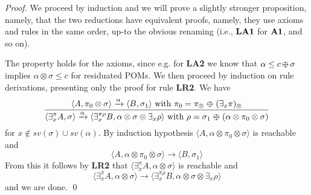 \documentclass{llncs}
\newcommand{\comment}[1]{}
\def\odiv{\, {\ominus\hspace{-7.7pt} \div} \,}
\begin{document}
\begin{proof}
We proceed by induction and we will prove a slightly stronger proposition, namely, that the two reductions
have equivalent proofs, namely, they use axioms and rules in the same order,
up-to the obvious renaming (i.e., ${\bf LA1}$ for ${\bf A1}$, and so on).

The property holds for the axioms, since e.g. for {\bf LA2} we know that
$\alpha \leq c \odiv \sigma$ implies $\alpha \otimes \sigma \leq c$ for residuated POMs.
%
We then proceed by induction on rule derivations,
presenting only the proof for rule {\bf LR2}.
%
We have 
  $$\frac {\displaystyle \langle A, \pi_0 \otimes \sigma \rangle \xrightarrow{\alpha}
  \langle B, \sigma_1 \rangle \text{ with } \pi_0 = \pi_\otimes \; {\ominus\hspace{-7.5pt} \div} \; (\exists_x \pi)_\otimes }
  {\displaystyle \langle \exists^\pi_x A, \sigma \rangle \xrightarrow{\alpha}
  \langle \exists^{\pi \rho}_x B, \alpha \otimes \sigma \otimes \exists_x \rho \rangle  \text{ with } \rho = \sigma_1 \; {\ominus\hspace{-7.5pt} \div} \; (\alpha \otimes \pi_0 \otimes \sigma)}$$
%
 for $x \not \in sv(\sigma) \cup sv(\alpha)$.
%
By induction hypothesis $\langle A, \alpha \otimes \pi_0 \otimes \sigma \rangle$ is reachable and
$$\langle A, \alpha \otimes \pi_0 \otimes \sigma \rangle \to
  \langle B, \sigma_1 \rangle$$
From this it follows by {\bf LR2} that $\langle \exists^\pi_x A, \alpha \otimes \sigma \rangle$ is reachable and
$$\langle \exists^\pi_x A, \alpha \otimes \sigma \rangle \to
  \langle \exists^{\pi \rho}_x B, \alpha \otimes \sigma \otimes \exists_x \rho \rangle$$
 and we are done.
 \qed
\comment{Reachability is implied by $\langle A, \pi_\otimes \otimes \widehat{\sigma_0} \rangle$ being reachable,
 with $\widehat{\sigma_0} = (\alpha \otimes \sigma) \odiv (\exists_x \pi)_\otimes$.
%
Now we have that 
$$\pi_\otimes \otimes \widehat{\sigma_0} = \pi_\otimes \otimes ((\alpha \otimes \sigma) \odiv (\exists_x \pi)_\otimes)$$ 
$$=^1 \pi_\otimes \otimes ((\alpha \otimes (\sigma \odiv (\exists_x \pi)_\otimes) \otimes (\exists_x \pi )_\otimes) \odiv (\exists_x \pi)_\otimes)$$
$$=^2  (\pi_\otimes \odiv (\exists_x \pi)_\otimes) \otimes (\exists_x \pi)_\otimes \otimes 
((\alpha \otimes (\sigma \odiv (\exists_x \pi)_\otimes) \otimes  (\exists_x \pi)_\otimes) \odiv (\exists_x \pi)_\otimes)$$
}
\end{proof}
\end{document}

